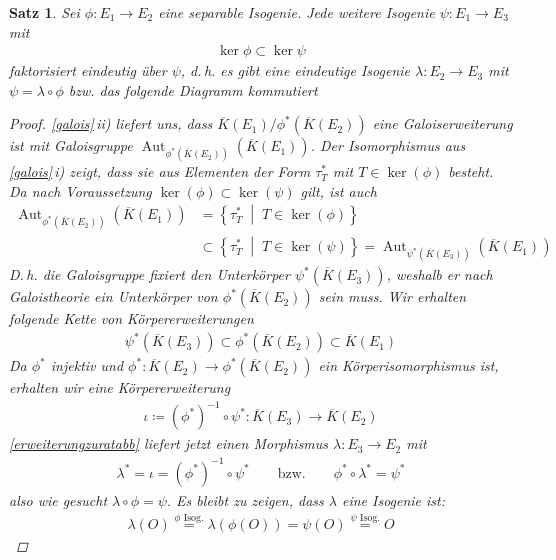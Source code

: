 \documentclass[english, german, parskip=half]{scrartcl}
\newtheorem{Satz}{Satz}[section]
\theoremstyle{definition}
\theoremstyle{remark}
\newcommand*{\algK}{\ensuremath{\overline K}} %
\newcommand*{\longto}{\longrightarrow}
\DeclareMathOperator{\Aut}{Aut} %
\begin{document}
\begin{Satz}\label{homomorphiesatz}
  Sei $\phi\colon E_1\to E_2$ eine separable Isogenie.
  Jede weitere Isogenie $\psi\colon E_1\to E_3$ mit
  \begin{gather*}
    \ker\phi \subset \ker\psi
  \end{gather*}
  faktorisiert eindeutig über $\psi$, d.\,h. es gibt eine eindeutige
  Isogenie $\lambda\colon E_2\to E_3$ mit
  $\psi = \lambda\circ\phi$
  bzw. das folgende Diagramm kommutiert
  \begin{center}
  \end{center}
  \begin{proof}
    \autoref{galois}\,ii) liefert uns, dass
    $\algK(E_1)/\phi^*(\algK(E_2))$ eine Galoiserweiterung ist mit
  Galoisgruppe $\Aut_{\phi^*(\algK(E_2))}(\algK(E_1))$.
  Der Isomorphismus aus \autoref{galois}\,i) zeigt, dass sie aus
  Elementen der Form $\tau_T^*$ mit $T\in\ker(\phi)$ besteht.
  Da nach Voraussetzung $\ker(\phi)\subset\ker(\psi)$ gilt,
  ist auch
  \begin{align*}
    \Aut_{\phi^*(\algK(E_2))}(\algK(E_1))
    &= \left\{ \tau_T^* \;\middle|\; T\in\ker(\phi) \right\} \\
    &\subset
      \left\{ \tau_T^* \;\middle|\; T\in\ker(\psi) \right\}
      = \Aut_{\psi^*(\algK(E_3))}(\algK(E_1))
  \end{align*}
  D.\,h. die Galoisgruppe fixiert den Unterkörper
  $\psi^*(\algK(E_3))$, weshalb er nach Galoistheorie ein
  Unterkörper von $\phi^*(\algK(E_2))$ sein muss.
  Wir erhalten folgende Kette von Körpererweiterungen
  \begin{gather*}
    \psi^*(\algK(E_3)) 
    \subset \phi^*(\algK(E_2)) 
    \subset \algK(E_1)
  \end{gather*}
  Da $\phi^*$ injektiv und 
  $\phi^*\colon\algK(E_2)\to\phi^*(\algK(E_2))$ ein
  Körperisomorphismus ist, erhalten wir eine Körpererweiterung
  \begin{gather*}
    \iota\coloneqq 
    (\phi^*)^{-1} \circ \psi^*
    \colon \algK(E_3) \longto \algK(E_2)
  \end{gather*}
  \autoref{erweiterungzuratabb} liefert jetzt einen Morphismus
  $\lambda\colon E_3\to E_2$ mit
  \begin{gather*}
    \lambda^* = \iota = (\phi^*)^{-1} \circ \psi^*
    \qquad\text{bzw.}\qquad
    \phi^*\circ\lambda^* = \psi^*
  \end{gather*}
  also wie gesucht $\lambda\circ\phi = \psi$.
  Es bleibt zu zeigen, dass $\lambda$ eine Isogenie ist:
  \begin{gather*}
    \lambda(O) 
    \overset{\text{$\phi$ Isog.}}{=} \lambda(\phi(O))
    = \psi(O) 
    \overset{\text{$\psi$ Isog.}}{=} O
  \end{gather*}
\end{proof}
\end{Satz}
\end{document}

